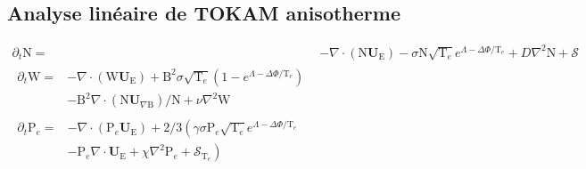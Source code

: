\label{Annexe C}
\begin{refsection}

\section*{Analyse linéaire de TOKAM anisotherme}
\begin{align}
\label{2-eqContinuiteTemp}
\partial_t \text{N}
=& - \nabla\cdot\left(\text{N}\mathbf U_\text{E}\right) -\sigma
\text{N}\sqrt{\text{T}_e}e^{\Lambda-\Delta\Phi/\text{T}_e} + D\nabla^2 \text{N}
+ \mathcal{S}
\\[0.5cm]
\label{2-eqCourantTemp}
\begin{split}
\partial_{t}\text{W} =& 
-\nabla\cdot\left(\text{W}\mathbf U_\text{E}\right)
+\text{B}^2\sigma\sqrt{\text{T}_e}\left(1-e^{\Lambda-\Delta\Phi/\text{T}_e}\right)\\
&-\text{B}^2\nabla\cdot\left(\text{N}\mathbf
U_{\nabla\text{B}}\right)/\text{N} +\nu\nabla^2\text{W}
\end{split}
\\[0.5cm]
\label{2-eqEnergyTemp}
\begin{split}
\partial_{t}\text{P}_e=&
-\nabla\cdot\left(\text{P}_e\mathbf U_\text{E}\right)
+2/3\left(\gamma\sigma\text{P}_e\sqrt{\text{T}_e}e^{\Lambda-\Delta\Phi/\text{T}_e}\right.\\
&\left.-\text{P}_e\nabla\cdot\mathbf U_\text{E}
+\chi\nabla^2\text{P}_e
+\mathcal{S}_{\text{T}_e}\right)
\end{split}
\end{align}
\end{refsection}
